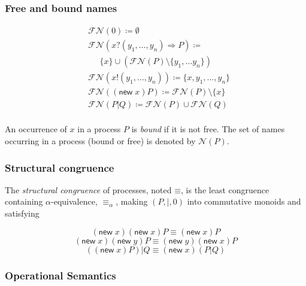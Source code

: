 \documentclass[]{acm_proc_article-sp}
\newcommand{\id}[1]{\texttt{#1}}
\newcommand{\pzero}{\mathbin{0}}
\newcommand{\juxtap}{\mathbin{\id{|}}}
\newcommand{\scong}{\mathbin{\equiv}}
\newcommand{\alphaeq}{\mathbin{\equiv_{\alpha}}}
\newcommand{\names}[1]{\mathbin{\mathcal{N}(#1)}}
\newcommand{\freenames}[1]{\mathbin{\mathcal{FN}(#1)}}
\newcommand{\defneqls}{\coloneqq}
\numberwithin{equation}{subsection}
\begin{document}
\subsubsection{Free and bound names}

\begin{equation*}
  \begin{aligned}
    & \freenames{\pzero} \defneqls \emptyset \\
    & \freenames{{x}{?}{( y_1, \ldots, y_n )} \Rightarrow {P}} \defneqls \\
    & \;\;\;\;\;\{ x \} \cup (\freenames{P} \setminus \{ y_1, \ldots y_n \}) \\
    & \freenames{{x}{!}{( y_1, \ldots, y_n )}} \defneqls \{ x, y_1, \ldots, y_n \} \\
    & \freenames{(\mathsf{new}\; x){P}} \defneqls \freenames{P} \setminus \{x\} \\    
    & \freenames{{P} \juxtap {Q}} \defneqls \freenames{P} \cup \freenames{Q} \\
  \end{aligned}
\end{equation*}

An occurrence of $x$ in a process $P$ is \textit{bound} if it is not
free. The set of names occurring in a process (bound or free) is
denoted by $\names{P}$.

\subsubsection{Structural congruence}
\label{congruence}

The {\em structural congruence} of processes, noted $\scong$, is the
least congruence containing $\alpha$-equivalence, $\alphaeq$, making
$( P, |, 0 )$ into commutative monoids and satisfying

\begin{equation*}  
  (\mathsf{new}\; x)(\mathsf{new}\; x){P} \scong (\mathsf{new}\; x)P
\end{equation*}
\begin{equation*}  
  (\mathsf{new}\; x)(\mathsf{new}\; y){P} \scong (\mathsf{new}\; y)(\mathsf{new}\; x)P
\end{equation*}
\begin{equation*}  
  ((\mathsf{new}\; x){P}) \juxtap {Q} \scong (\mathsf{new}\; x)({P} \juxtap {Q})
\end{equation*}

\subsubsection{Operational Semantics}\label{section:opsem}
 
\end{document}
